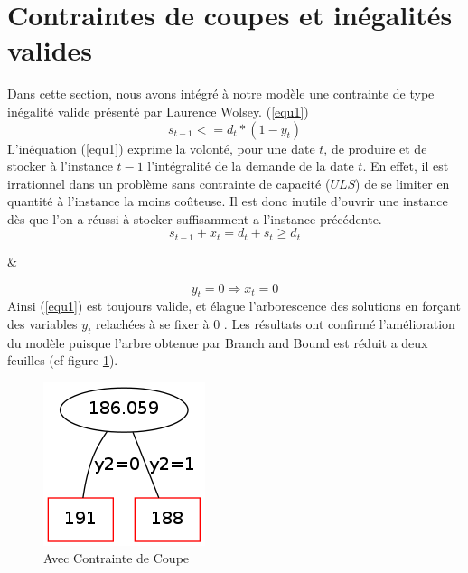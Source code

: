 \documentclass[a4paper,11pt,twoside]{report}
\begin{document}
\section{Contraintes de coupes et inégalités valides}
Dans cette section, nous avons intégré à notre modèle une contrainte de type inégalité valide présenté par Laurence Wolsey. (\ref{equ1})
\begin{equation}
s_{t-1} <= d_{t}*(1-y_{t}) \label{equ1}
\end{equation}
L'inéquation (\ref{equ1}) exprime la volonté, pour une date $t$, de produire et de stocker à l'instance $t-1$ l'intégralité de la demande de la date $t$.
En effet, il est irrationnel dans un problème sans contrainte de capacité ($ULS$) de se limiter en quantité à l'instance la moins coûteuse.
Il est donc inutile d'ouvrir une instance dès que l'on a réussi à stocker suffisamment a l'instance précédente.
\begin{equation}
s_{t-1}+x_{t} = d_{t}+s_{t} \geq d_{t}
\end{equation}
\begin{center}\&\end{center}
\begin{equation}
y_{t}=0 \Rightarrow x_{t}=0
\end{equation}
Ainsi (\ref{equ1}) est toujours valide, et élague l'arborescence des solutions en forçant des variables $y_{t}$ relachées à se fixer à 0 .
Les résultats ont confirmé l'amélioration du modèle puisque l'arbre obtenue par Branch and Bound est réduit a deux feuilles (cf figure \ref{graph3}).
\begin{figure}[h]
 \centering
 \includegraphics[width=\textwidth/4]{graph3.png}
 \caption{Avec Contrainte de Coupe}
 \label{graph3}
\end{figure}
\end{document}
